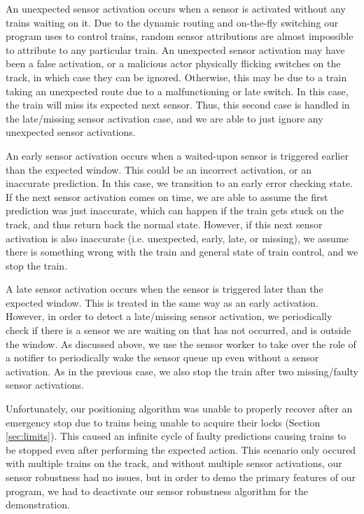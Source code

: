 \documentclass[12pt, titlepage]{article}
\begin{document}
    An unexpected sensor activation occurs when a sensor is activated without any trains waiting on it. Due to the dynamic routing and on-the-fly switching our program uses to control trains, random sensor attributions are almost impossible to attribute to any particular train. An unexpected sensor activation may have been a false activation, or a malicious actor physically flicking switches on the track, in which case they can be ignored. Otherwise, this may be due to a train taking an unexpected route due to a malfunctioning or late switch. In this case, the train will miss its expected next sensor. Thus, this second case is handled in the late/missing sensor activation case, and we are able to just ignore any unexpected sensor activations.
    
    An early sensor activation occurs when a waited-upon sensor is triggered earlier than the expected window. This could be an incorrect activation, or an inaccurate prediction. In this case, we transition to an early error checking state. If the next sensor activation comes on time, we are able to assume the first prediction was just inaccurate, which can happen if the train gets stuck on the track, and thus return back the normal state. However, if this next sensor activation is also inaccurate (i.e. unexpected, early, late, or missing), we assume there is something wrong with the train and general state of train control, and we stop the train.

    A late sensor activation occurs when the sensor is triggered later than the expected window. This is treated in the same way as an early activation. However, in order to detect a late/missing sensor activation, we periodically check if there is a sensor we are waiting on that has not occurred, and is outside the window. As discussed above, we use the sensor worker to take over the role of a notifier to periodically wake the sensor queue up even without a sensor activation. As in the previous case, we also stop the train after two missing/faulty sensor activations.
    
    Unfortunately, our positioning algorithm was unable to properly recover after an emergency stop due to trains being unable to acquire their locks (Section \ref{sec:limits}). This caused an infinite cycle of faulty predictions causing trains to be stopped even after performing the expected action. This scenario only occured with multiple trains on the track, and without multiple sensor activations, our sensor robustness had no issues, but in order to demo the primary features of our program, we had to deactivate our sensor robustness algorithm for the demonstration.
    
\end{document}
